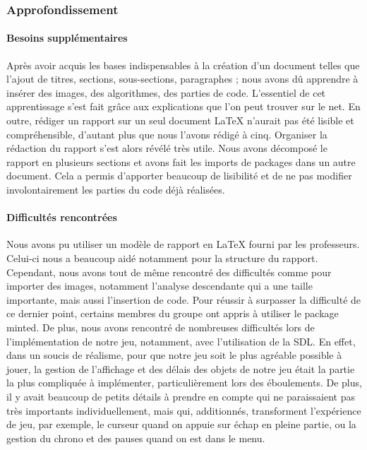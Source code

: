         
        \subsubsection{Approfondissement}
            \paragraph{Besoins supplémentaires} Après avoir acquis les bases indispensables à la création d'un document telles que l'ajout de titres, sections, sous-sections, paragraphes ; nous avons dû apprendre à insérer des images, des algorithmes, des parties de code. L'essentiel de cet apprentissage s'est fait grâce aux explications que l'on peut trouver sur le net. En outre, rédiger un rapport sur un seul document \LaTeX{} n'aurait pas été lisible et compréhensible, d'autant plus que nous l'avons rédigé à cinq. Organiser la rédaction du rapport s'est alors révélé très utile. Nous avons décomposé le rapport en plusieurs sections et avons fait les imports de packages dans un autre document. Cela a permis d'apporter beaucoup de lisibilité et de ne pas modifier involontairement les parties du code déjà réalisées.
            
            
            \paragraph{Difficultés rencontrées} Nous avons pu utiliser un modèle de rapport en \LaTeX{} fourni par les professeurs. Celui-ci nous a beaucoup aidé notamment pour la structure du rapport. Cependant, nous avons tout de même rencontré des difficultés comme pour importer des images, notamment l'analyse descendante qui a une taille importante, mais aussi l'insertion de code. Pour réussir à surpasser la difficulté de ce dernier point, certains membres du groupe ont appris à utiliser le package minted. 
            \newline
            De plus, nous avons rencontré de nombreuses difficultés lors de l'implémentation de notre jeu, notamment, avec l'utilisation de la SDL. En effet, dans un soucis de réalisme, pour que notre jeu soit le plus agréable possible à jouer, la gestion de l'affichage et des délais des objets de notre jeu était la partie la plus compliquée à implémenter, particulièrement lors des éboulements. De plus, il y avait beaucoup de petits détails à prendre en compte qui ne paraissaient pas très importants individuellement, mais qui, additionnés, transforment l'expérience de jeu, par exemple, le curseur quand on appuie sur échap en pleine partie, ou la gestion du chrono et des pauses quand on est dans le menu. 
                




